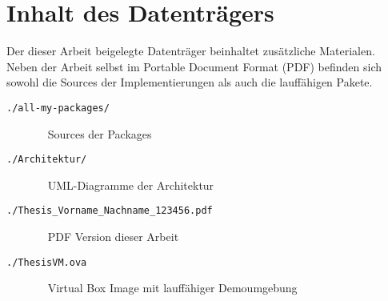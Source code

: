 \section{Inhalt des Datenträgers}
\label{apx:Datentraeger}

Der dieser Arbeit beigelegte Datenträger beinhaltet zusätzliche Materialen. 
Neben der Arbeit selbst im Portable Document Format (PDF) befinden sich sowohl die Sources der Implementierungen als auch die lauffähigen Pakete.
\begin{description}
	\item[\texttt{./all-my-packages/}] ~ \linebreak
	\noindent\hspace*{10mm} Sources der Packages
	\item[\texttt{./Architektur/}] ~ \linebreak 
	\noindent\hspace*{10mm} UML-Diagramme der Architektur
	\item[\texttt{./Thesis\_Vorname\_Nachname\_123456.pdf}] ~ \linebreak 
	\noindent\hspace*{10mm} PDF Version dieser Arbeit
	\item[\texttt{./ThesisVM.ova}] ~ \linebreak 
	\noindent\hspace*{10mm} Virtual Box Image mit lauffähiger Demoumgebung
\end{description}